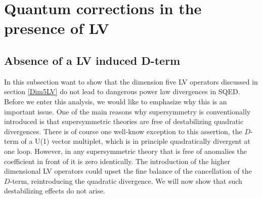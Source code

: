 \documentclass[12pt]{revtex4}
\begin{document}
\section{Quantum corrections in the presence of LV}
\label{quantum}




\subsection{Absence of a LV induced D-term}
\label{noDterm}

In this subsection want to show that the dimension five LV operators
discussed in section \ref{Dim5LV} do not lead to dangerous power 
law divergences in SQED. Before we enter this analysis, we would like
to emphasize why this is an important issue. One of the main reasons
why supersymmetry is conventionally introduced is that 
supersymmetric theories are free of destabilizing quadratic
divergences. There is of course one well-know 
exception to this assertion, the $D$-term of a U(1) vector multiplet,
which is in principle quadratically divergent at one loop. 
However, in any supersymmetric theory that is free of anomalies the
coefficient in front of it is zero identically. The introduction of the
higher dimensional LV operators could upset the fine balance of the
cancellation of the $D$-term, reintroducing the quadratic
divergence. We will now show that such destabilizing effects do not
arise. 
\end{document}
